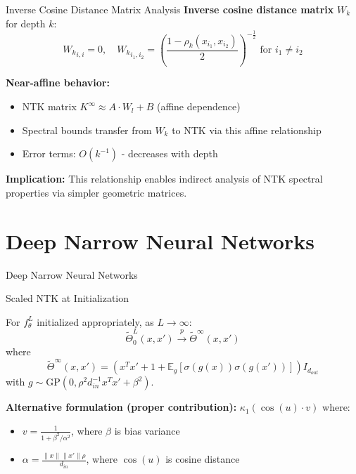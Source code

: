 \documentclass{beamer}
\newcommand{\E}{\mathbb{E}}
\begin{document}
\begin{frame}{Inverse Cosine Distance Matrix Analysis}
\textbf{Inverse cosine distance matrix} $W_k$ for depth $k$:
\[ {W_k}_{i,i} = 0, \quad {W_k}_{i_1,i_2} = \left( \frac{1 - \rho_k(x_{i_1},x_{i_2})}{2} \right)^{-\frac{1}{2}} \text{ for } i_1 \neq i_2 \]

\textbf{Near-affine behavior:}
\begin{itemize}
\item NTK matrix $K^{\infty} \approx A \cdot W_l + B$ (affine dependence)
\item Spectral bounds transfer from $W_k$ to NTK via this affine relationship
\item Error terms: $O(k^{-1})$ - decreases with depth
\end{itemize}

\textbf{Implication:} This relationship enables indirect analysis of NTK spectral properties via simpler geometric matrices.
\end{frame}

\section{Deep Narrow Neural Networks}

\begin{frame}
\begin{center}
\huge{Deep Narrow Neural Networks}
\end{center}
\end{frame}

\begin{frame}{Scaled NTK at Initialization}
\begin{theorem}
For $f^L_\theta$ initialized appropriately, as $L \to \infty$:
\[ \tilde{\Theta}^L_0(x, x') \xrightarrow{p} \tilde{\Theta}^\infty(x, x') \]
where
\[ \tilde{\Theta}^\infty(x, x') = (x^T x' + 1 + \E_g[\sigma(g(x))\sigma(g(x'))]) I_{d_{out}} \]
with $g \sim \text{GP}(0, \rho^2 d_{in}^{-1} x^T x' + \beta^2)$.
\end{theorem}

\textbf{Alternative formulation (proper contribution):} $\kappa_1(\cos(u) \cdot v)$ where:
\begin{itemize}
\item $v = \frac{1}{1 + \beta^2/\alpha^2}$, where $\beta$ is bias variance
\item $\alpha = \frac{\|x\| \|x'\| \rho}{d_{in}}$, where $\cos(u)$ is cosine distance
\end{itemize}
\end{frame}
\end{document}
